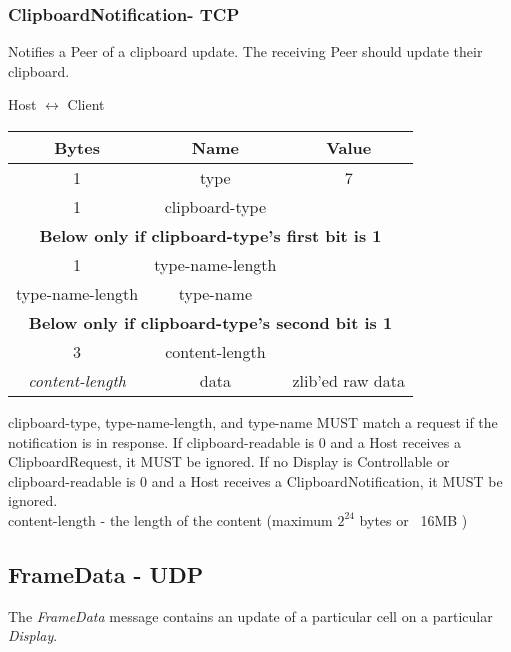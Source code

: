 \subsubsection{ClipboardNotification- TCP}

Notifies a Peer of a clipboard update. The receiving Peer should update their clipboard.

\begin{center}
    Host $\leftrightarrow$ Client\\
    \begin{tabular}{|c|c|c|}
        \hline
        \textbf{Bytes}        & \textbf{Name}    & \textbf{Value}   \\
        \hline
        1                     & type             & 7                \\
        \hline
        1                     & clipboard-type   &                  \\
        \hline
        \multicolumn{3}{|c|}{\textbf{Below only if clipboard-type's first bit is 1} } \\
        \hline
        1                     & type-name-length &                  \\
        \hline
        type-name-length      & type-name        &                  \\
        \hline
        \multicolumn{3}{|c|}{\textbf{Below only if clipboard-type's second bit is 1} } \\
        3                     & content-length   &                  \\
        \hline
        \emph{content-length} & data             & zlib'ed raw data \\
        \hline
    \end{tabular}
\end{center}


clipboard-type, type-name-length, and type-name MUST match a request if the notification is in response. If
clipboard-readable is 0 and a Host receives a ClipboardRequest, it MUST be ignored. If no Display is Controllable or
clipboard-readable is 0 and a Host receives a ClipboardNotification, it MUST be ignored.\\

content-length -  the length of the content  (maximum $2^{24}$ bytes or ~16MB )\\

\subsection{FrameData - UDP}
The \emph{FrameData} message contains an update of a particular cell on a particular \emph{Display}.

